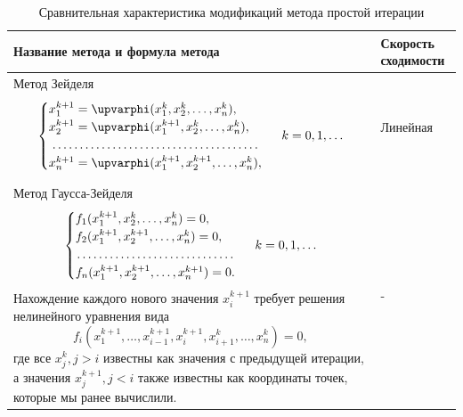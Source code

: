 \documentclass[a4paper, 12pt]{report}
\numberwithin{equation}{section}
\renewcommand{\varphi}{\upvarphi}
\begin{document}
	\begin{table}[h!]
		\centering
		\renewcommand{\arraystretch}{1.5}
		\begin{tabular}{|p{12cm}|p{3cm}|}
			\hline
			\textbf{Название метода и формула метода} & \textbf{Скорость сходимости} \\
			\hline
			
			Метод Зейделя
			\begin{equation}
				\begin{cases}
					x_1^{k+1} = \varphi(x_1^k, x_2^k,\ldots, x_n^k),\\
					x_2^{k+1} = \varphi(x_1^{k+1}, x_2^k,\ldots, x_n^k),\\
					\dotfill\\
					x_n^{k+1} = \varphi(x_1^{k+1}, x_2^{k+1},\ldots, x_n^k),
				\end{cases}\ k=0,1,\ldots
			\end{equation}  & 
			Линейная\\
			\hline
			
			Метод Гаусса-Зейделя
			\begin{equation}
				\begin{cases}
					f_1(x_1^{k+1},x_2^k,\ldots,x_n^k) = 0,\\
					f_2(x_1^{k+1},x_2^{k+1},\ldots,x_n^k) = 0,\\
					\dotfill\\
					f_n(x_1^{k+1},x_2^{k+1},\ldots,x_n^{k+1}) = 0.
				\end{cases}\ k=0,1,\ldots
			\end{equation} 
			Нахождение каждого нового значения $x_i^{k+1}$ требует решения нелинейного уравнения вида $$f_i(x_1^{k+1},\ldots, x_{i-1}^{k+1}, x_i^{k+1}, x_{i+1}^k, \ldots, x_n^k) = 0,$$
			где все $x_j^k, j>i$ известны как значения с предыдущей итерации, а значения $x_j^{k+1}, j<i$ также известны как координаты точек, которые мы ранее вычислили. &  
			-\\
			\hline
			
		\end{tabular}
		\caption{Сравнительная характеристика модификаций метода простой итерации}
	\end{table}
	
\end{document}
